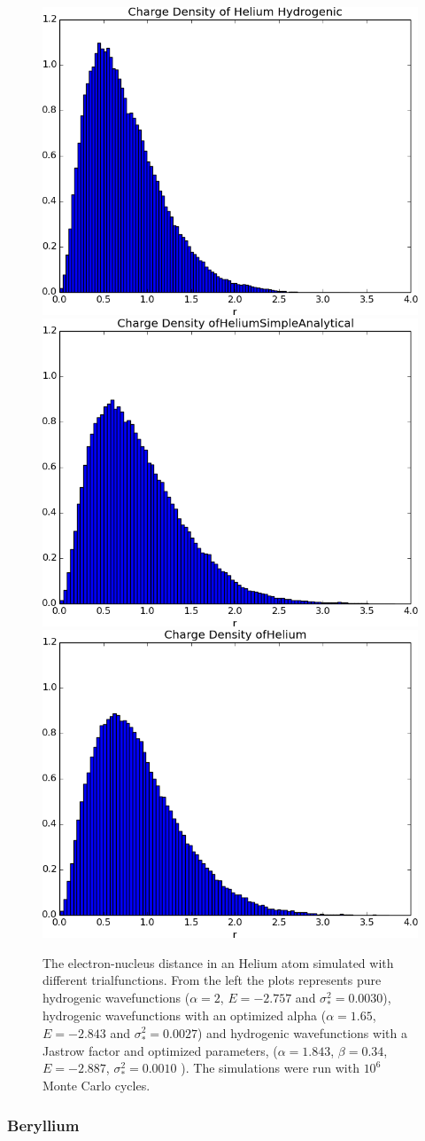 		\begin{figure}
				\centering 
				\includegraphics[width=0.32\linewidth]{../figures/used/ChargeDensityHeliumHydrogenic}
				\includegraphics[width=0.32\linewidth]{../figures/used/ChargeDensityHeliumSimpleAnalytical}
				\includegraphics[width=0.32\linewidth]{../figures/used/ChargeDensityHelium_trimmed}
				\protect\caption{The electron-nucleus distance in an Helium atom simulated with different trialfunctions. From the left the plots represents pure hydrogenic wavefunctions ($\alpha = 2$, $E = -2.757$ and $\sigma^2_* = 0.0030$), hydrogenic wavefunctions with an optimized alpha ($\alpha = 1.65$, $E = -2.843$ and $\sigma^2_* = 0.0027$) and hydrogenic wavefunctions with a Jastrow factor and optimized parameters, ($\alpha = 1.843$, $\beta = 0.34$, $E = -2.887$, $\sigma^2_* = 0.0010$ ). The simulations were run with \(10^6\) Monte Carlo cycles.}
				\label{fig:HeliumChargeDensity}
		\end{figure}


	\subsubsection{Beryllium}

